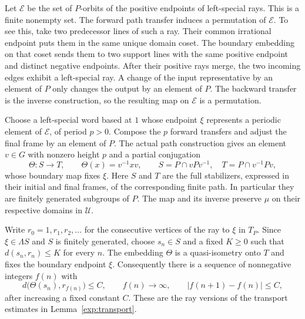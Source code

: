 Let $\mathcal E$ be the set of $P$-orbits of the positive endpoints of
left-special rays. This is a finite nonempty set. The forward path
transfer induces a permutation of $\mathcal E$. To see this, take two
predecessor lines of such a ray. Their common irrational endpoint puts
them in the same unique domain coset. The boundary embedding on that
coset sends them to two support lines with the same positive endpoint
and distinct negative endpoints. After their positive rays merge, the
two incoming edges exhibit a left-special ray. A change of the input
representative by an element of $P$ only changes the output by an
element of $P$. The backward transfer is the inverse construction, so
the resulting map on $\mathcal E$ is a permutation.

Choose a left-special word based at $1$ whose endpoint $\xi$ represents
a periodic element of $\mathcal E$, of period $p>0$.
Compose the $p$ forward transfers and adjust the final frame by an
element of $P$. The actual path construction gives an element $v\in G$
with nonzero height $p$ and a partial conjugation
\begin{equation}\label{ray:return}
 \Theta:S\longrightarrow T,\qquad
 \Theta(x)=v^{-1}xv,\qquad
 S=P\cap vPv^{-1},\quad T=P\cap v^{-1}Pv,
\end{equation}
whose boundary map fixes $\xi$. Here $S$ and $T$ are the full
stabilizers, expressed in their initial and final frames, of the
corresponding finite path. In particular they are finitely generated
subgroups of $P$. The map and its inverse preserve $\mu$ on their
respective domains in $\mathcal U$.

Write $r_0=1,r_1,r_2,\ldots$ for the consecutive vertices of the ray to
$\xi$ in $T_P$. Since $\xi\in\Lambda S$ and $S$ is finitely generated,
choose $s_n\in S$ and a fixed $K\geq0$ such that
$d(s_n,r_n)\leq K$ for every $n$.
The embedding $\Theta$ is a quasi-isometry onto $T$ and fixes the
boundary endpoint $\xi$. Consequently there is a sequence of
nonnegative integers $f(n)$ with
\begin{equation}\label{ray:indices}
 d\bigl(\Theta(s_n),r_{f(n)}\bigr)\leq C,
 \qquad f(n)\longrightarrow\infty,
 \qquad |f(n+1)-f(n)|\leq C,
\end{equation}
after increasing a fixed constant $C$. These are the ray versions of
the transport estimates in Lemma~\ref{exp:transport}.

